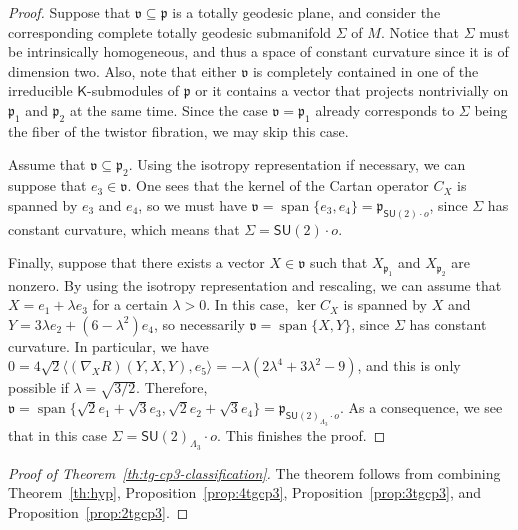 \documentclass[11pt,a4paper,final]{amsart}
\newcommand{\g}{\mathfrak}
\newcommand{\vecspan}{\operatorname{span}}
\theoremstyle{definition}
\begin{document}
\begin{proof}
	Suppose that $\g{v}\subseteq \g{p}$ is a totally geodesic plane, and consider the corresponding complete totally geodesic submanifold $\Sigma$ of $M$.
	Notice that $\Sigma$ must be intrinsically homogeneous, and thus a space of constant curvature since it is of dimension two.
	Also, note that either $\g{v}$ is completely contained in one of the irreducible $\mathsf{K}$-submodules of $\g{p}$ or it contains a vector that projects nontrivially on $\g{p}_{1}$ and $\g{p}_{2}$ at the same time.
	Since the case $\g{v}=\g{p}_{1}$ already corresponds to $\Sigma$ being the fiber of the twistor fibration, we may skip this case.
		
	Assume that $\g{v}\subseteq \g{p}_{2}$.
	Using the isotropy representation if necessary, we can suppose that $e_{3}\in \g{v}$.	
	One sees that the kernel of the Cartan operator $C_{X}$ is spanned by $e_{3}$ and $e_{4}$, so we must have $\g{v}=\vecspan\{e_{3},e_{4}\}=\g{p}_{\mathsf{SU}(2)\cdot o}$, since $\Sigma$ has constant curvature, which means that $\Sigma=\mathsf{SU}(2)\cdot o$.
	
	Finally, suppose that there exists a vector $X\in \g{v}$ such that $X_{\g{p}_{1}}$ and $X_{\g{p}_{2}}$ are nonzero.
	By using the isotropy representation and rescaling, we can assume that $X=e_{1}+ \lambda e_{3}$ for a certain $\lambda>0$.
	In this case, $\ker C_{X}$ is spanned by $X$ and $Y=3 \lambda e_{2}+(6-\lambda^{2})e_{4}$, so necessarily $\g{v}=\vecspan\{X,Y\}$, since $\Sigma$ has constant curvature.
	In particular, we have $0=4 \sqrt{2}\langle (\nabla_{X}R)(Y,X,Y),e_{5} \rangle = -\lambda  \left(2 \lambda ^4+3 \lambda^2-9\right)$,
	and this is only possible if $\lambda=\sqrt{3/2}$.
	Therefore, $\g{v}=\vecspan\{\sqrt{2}e_{1}+\sqrt{3}e_{3},\sqrt{2}e_{2}+\sqrt{3}e_{4}\}=\g{p}_{\mathsf{SU}(2)_{\Lambda_{3}}\cdot o}$.
	As a consequence, we see that in this case $\Sigma = \mathsf{SU}(2)_{\Lambda_{3}}\cdot o$.
	This finishes the proof. \qedhere
\end{proof}
	
\begin{proof}[Proof of Theorem~\ref{th:tg-cp3-classification}]
	The theorem follows from combining Theorem~\ref{th:hyp}, Proposition~\ref{prop:4tgcp3}, Proposition~\ref{prop:3tgcp3}, and Proposition~\ref{prop:2tgcp3}.
\end{proof}
	 
\end{document}
